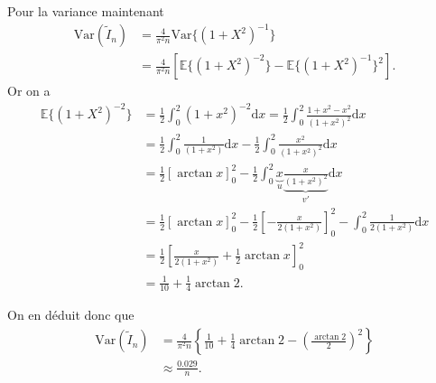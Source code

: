 \documentclass[11pt]{td_um}
\begin{document}
\begin{exo}{}
\begin{enumerate}
{                Pour la variance maintenant
                \begin{align*}
                    \mbox{Var}(\tilde{I}_n) &= \frac{4}{\pi^2 n} \mbox{Var}\{(1 + X^2)^{-1}\}\\
                    &= \frac{4}{\pi^2 n} \left[ \mathbb{E}\{(1 + X^2)^{-2}\} -
                    \mathbb{E}\{(1 + X^2)^{-1}\}^2 \right].
                \end{align*}
                Or on a
                \begin{align*}
                    \mathbb{E}\{(1 + X^2)^{-2}\} &= \frac{1}{2} \int_0^2 (1 +
                    x^2)^{-2} \mbox{d$x$} =
                    \frac{1}{2} \int_0^2 \frac{1 +
                    x^2 - x^2}{(1 + x^2)^2}
                    \mbox{d$x$}\\
                    &= \frac{1}{2} \int_0^2 \frac{1}{(1
                    + x^2)} \mbox{d$x$} - \frac{1}{2}
                    \int_0^2 \frac{x^2}{(1 + x^2)^2} \mbox{d$x$}\\
                    &= \frac{1}{2} [\arctan x]_0^2 -
                    \frac{1}{2}\int_0^2
                    \underbrace{x}_u  \underbrace{\frac{x}{(1 +
                    x^2)^2}}_{v'} \mbox{d$x$}\\
                    &= \frac{1}{2} [\arctan x]_0^2 -
                    \frac{1}{2} \left[-\frac{x}{2 (1 + x^2)} \right]_0^2 -
                    \int_0^2 \frac{1}{2 (1 + x^2)} \mbox{d$x$}\\
                    &= \frac{1}{2} \left[\frac{x}{2 (1 + x^2)} + \frac{1}{2}
                    \arctan x \right]_0^2\\
                    &= \frac{1}{10} + \frac{1}{4} \arctan 2.
                \end{align*}

                On en déduit donc que
                \begin{align*}
                    \mbox{Var}(\tilde{I}_n) &= \frac{4}{\pi^2 n} \left\{\frac{1}{10}
                        + \frac{1}{4} \arctan 2 -
                        \left(\frac{\arctan 2}{2} \right)^2
                    \right\}\\
                    &\approx \frac{0.029}{n}.
                \end{align*}

}
\end{enumerate}
\end{exo}
\end{document}
